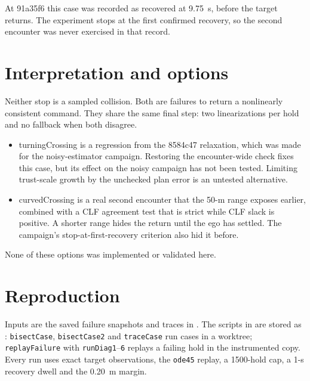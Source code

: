 \documentclass[11pt]{article}
\begin{document}
At 91a35f6 this case was recorded as recovered at 9.75~s, before the target
returns. The experiment stops at the first confirmed recovery, so the second
encounter was never exercised in that record.

\section{Interpretation and options}
Neither stop is a sampled collision. Both are failures to return a
nonlinearly consistent command. They share the same final step: two
linearizations per hold and no fallback when both disagree.
\begin{itemize}
\item turningCrossing is a regression from the 8584c47 relaxation, which was
made for the noisy-estimator campaign. Restoring the encounter-wide check
fixes this case, but its effect on the noisy campaign has not been tested.
Limiting trust-scale growth by the unchecked plan error is an untested
alternative.
\item curvedCrossing is a real second encounter that the 50-m range exposes
earlier, combined with a CLF agreement test that is strict while CLF slack is
positive. A shorter range hides the return until the ego has settled. The
campaign's stop-at-first-recovery criterion also hid it before.
\end{itemize}
None of these options was implemented or validated here.

\section{Reproduction}
Inputs are the saved failure snapshots and traces in
. The
scripts in  are stored as
: \texttt{bisectCase}, \texttt{bisectCase2} and
\texttt{traceCase} run cases in a worktree; \texttt{replayFailure} with
\texttt{runDiag1}--\texttt{6} replays a failing hold in the instrumented
copy. Every run uses exact target observations, the \texttt{ode45} replay,
a 1500-hold cap, a 1-s recovery dwell and the 0.20~m margin.
\end{document}
